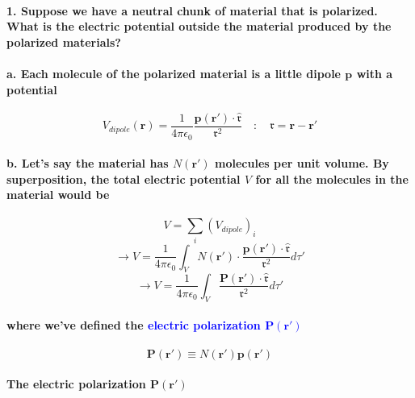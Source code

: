 \documentclass{article}
\begin{document}
\paragraph{1. Suppose we have a neutral chunk of material that is polarized. What is the electric potential outside the material produced by the polarized materials?}
\paragraph{\indent a. Each molecule of the polarized material is a little dipole $\boldsymbol{p}$ with a potential}
\begin{equation*}
    V_{dipole}(\boldsymbol{r}) =\frac{1}{4\pi\epsilon_0}\frac{\boldsymbol{p(r')}\cdot\hat{\boldsymbol{\mathfrak{r}}}}{\mathfrak{r^2}}\quad:\quad \mathfrak{r}=\boldsymbol{r-r'}
\end{equation*}
\paragraph{\indent b. Let's say the material has $N(\boldsymbol{r'})$ molecules per unit volume. By superposition, the total electric potential $V$ for all the molecules in the material would be }
\begin{equation*}
    V=\sum_i (V_{dipole})_i
\end{equation*}
\begin{equation*}
    \rightarrow V=\frac{1}{4\pi\epsilon_0}\int_V N(\boldsymbol{r'})\cdot \frac{\boldsymbol{p}(\boldsymbol{r'})\cdot \hat{\boldsymbol{\mathfrak{r}}}}{\mathfrak{r}^2}d\tau'
\end{equation*}
\begin{equation*}
    \rightarrow V=\frac{1}{4\pi\epsilon_0}\int_V  \frac{\boldsymbol{P}(\boldsymbol{r'})\cdot \hat{\boldsymbol{\mathfrak{r}}}}{\mathfrak{r}^2}d\tau'
\end{equation*}
\paragraph{where we've defined the \textcolor{blue}{electric polarization $\boldsymbol{P}(\boldsymbol{r'})$}}
\begin{equation*}
    \boldsymbol{P}(\boldsymbol{r'})\equiv N(\boldsymbol{r'})\boldsymbol{p}(\boldsymbol{r'})
\end{equation*}
\paragraph{The electric polarization $\boldsymbol{P}(\boldsymbol{r'})$}
\end{document}
